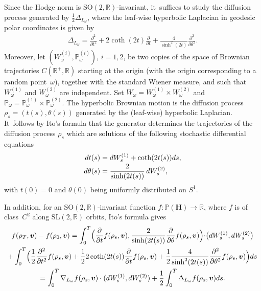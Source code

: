 \documentclass[JEP,XML,SOM,Unicode,published]{cedram}
\theoremstyle{plain}
\theoremstyle{definition}
\numberwithin{equation}{subsection}
\newcommand\bP{\mathbb{P}}
\newcommand\bR{\mathbb{R}}\let\R\bR
\newcommand{\SL}{\mathrm{SL}}
\newcommand{\SO}{\mathrm{SO}}
\let\gradient\nabla
\let\laplacian\Delta
\newcommand{\bfH}{\boldsymbol{H}}
\newcommand{\bfv}{\boldsymbol{v}}
\begin{document}
Since the Hodge norm is $\SO(2,\bR)$-invariant, it~suffices to study the diffusion process generated by $\frac{1}{2}\laplacian_{L_\omega}$, where the leaf-wise hyperbolic Laplacian in geodesic polar coordinates is given by
\begin{align}\laplacian_{L_\omega} = \frac{\partial^2}{\partial t^2} + 2\coth(2t)\frac{\partial}{\partial t}+\frac{4}{\sinh^2(2t)}\frac{\partial^2}{\partial \theta^2}.
\end{align} Moreover, let $(W_\omega^{(i)},\bP_\omega^{(i)})$, $i =1, 2$, be two copies of the space of Brownian trajectories $C(\bR^{+},\bR)$ starting at the origin (with the origin corresponding to a random point~$\omega$), together with the standard Wiener measure, and such that $W_\omega^{(1)}$ and $W_\omega^{(2)}$ are independent. Set $W_\omega = W_\omega^{(1)}\times W_\omega^{(2)}$ and $\bP_\omega = \bP_\omega^{(1)} \times \bP_\omega^{(2)}$. The hyperbolic Brownian motion is the diffusion process $\rho_s = (t(s),\theta (s))$ generated by the (leaf-wise) hyperbolic Laplacian. It~follows by Ito's formula \cite[Th.\,IV.3.3]{RY} that the generator determines the trajectories of the diffusion process $\rho_s$ which are solutions of the following stochastic differential equations\vspace*{-3pt}
\begin{align}
dt(s) &= dW_s^{(1)} + \coth(2t(s)) ds,\label{tsdef} \\[-2pt]
d\theta(s) &= \frac{2}{\sinh(2t(s))}\, dW_s^{(2)},\notag
\end{align}
with $t(0) = 0$ and $\theta(0)$ being uniformly distributed on $S^1$.

In addition, for an $\SO(2,\bR)$-invariant function $f : \bP(\bfH) \to \bR$, where $f$ is of class~$C^2$ along $\SL(2,\bR)$ orbits, Ito's formula gives\vspace*{-5pt}\enlargethispage{.5\baselineskip}
\begin{multline*}
f(\rho_T,\bfv) - f(\rho_0,\bfv) = \int_0^T \Bigl(\frac{\partial}{\partial t} f(\rho_s,\bfv),\frac{2}{\sinh(2t(s))} \frac{\partial}{\partial \theta} f(\rho_s,\bfv) \Bigl) \cdot \bigl(dW^{(1)}_s,dW^{(2)}_s\bigr) \\
+ \int_0^T \Bigl(\frac{1}{2}\frac{\partial^2 }{\partial t^2} f(\rho_s,\bfv) + \frac{1}{2}2\coth(2t(s))\frac{\partial}{\partial t} f(\rho_s,\bfv)+\frac{1}{2}\frac{4}{\sinh^2(2t(s))}\frac{\partial^2 }{\partial \theta^2} f(\rho_s,\bfv) \Bigr)ds \\
= \int_0^T \gradient_{L_\omega} f(\rho_s,\bfv) \cdot (dW^{(1)}_s,dW^{(2)}_s) + \frac{1}{2}\int_0^T \laplacian_{L_\omega} f(\rho_s,\bfv) ds.
\end{multline*}
\end{document}
